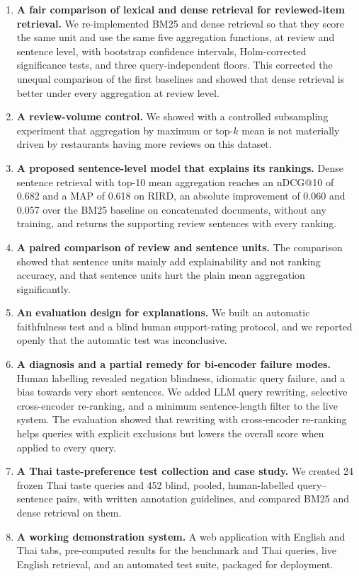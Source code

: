 \begin{enumerate}
    \item \textbf{A fair comparison of lexical and dense retrieval for reviewed-item retrieval.} We re-implemented BM25 and dense retrieval so that they score the same unit and use the same five aggregation functions, at review and sentence level, with bootstrap confidence intervals, Holm-corrected significance tests, and three query-independent floors. This corrected the unequal comparison of the first baselines and showed that dense retrieval is better under every aggregation at review level.
    \item \textbf{A review-volume control.} We showed with a controlled subsampling experiment that aggregation by maximum or top-$k$ mean is not materially driven by restaurants having more reviews on this dataset.
    \item \textbf{A proposed sentence-level model that explains its rankings.} Dense sentence retrieval with top-10 mean aggregation reaches an nDCG@10 of 0.682 and a MAP of 0.618 on RIRD, an absolute improvement of 0.060 and 0.057 over the BM25 baseline on concatenated documents, without any training, and returns the supporting review sentences with every ranking.
    \item \textbf{A paired comparison of review and sentence units.} The comparison showed that sentence units mainly add explainability and not ranking accuracy, and that sentence units hurt the plain mean aggregation significantly.
    \item \textbf{An evaluation design for explanations.} We built an automatic faithfulness test and a blind human support-rating protocol, and we reported openly that the automatic test was inconclusive.
    \item \textbf{A diagnosis and a partial remedy for bi-encoder failure modes.} Human labelling revealed negation blindness, idiomatic query failure, and a bias towards very short sentences. We added LLM query rewriting, selective cross-encoder re-ranking, and a minimum sentence-length filter to the live system. The evaluation showed that rewriting with cross-encoder re-ranking helps queries with explicit exclusions but lowers the overall score when applied to every query.
    \item \textbf{A Thai taste-preference test collection and case study.} We created 24 frozen Thai taste queries and 452 blind, pooled, human-labelled query--sentence pairs, with written annotation guidelines, and compared BM25 and dense retrieval on them.
    \item \textbf{A working demonstration system.} A web application with English and Thai tabs, pre-computed results for the benchmark and Thai queries, live English retrieval, and an automated test suite, packaged for deployment.
\end{enumerate}

